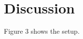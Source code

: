 \documentclass{article}
\begin{document}
\begin{abstract}
Table 2 summarizes the result over 5 seeds.
\end{abstract}
\section{Discussion}
Figure 3 shows the setup.
\end{document}

